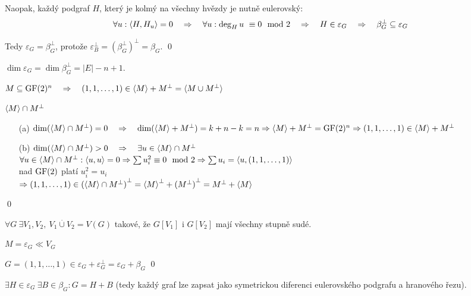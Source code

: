 Naopak, každý podgraf $H$, který je kolmý na všechny hvězdy je nutně eulerovský:
\begin{align*}
\forall u: {\langle H,H_u\rangle} = 0 \quad\Rightarrow\quad \forall u: \deg_H u~\equiv 0 \mod 2 \quad\Rightarrow\quad H \in \varepsilon_G \quad\Rightarrow\quad \beta_G^\bot \subseteq \varepsilon_G
\end{align*}

Tedy $\varepsilon_G = \beta_G^\bot$, protože $\varepsilon_B^\bot = {\left(\beta_G^\bot\right)}^\bot = \beta_G$.
\qed

\dsl $\dim \varepsilon_G = \dim \beta_G^\bot = |E| - n + 1$.


\vt $M \subseteq \mathrm{GF}(2)^n \quad\Rightarrow\quad (1,1,\dots,1) \in {\langle M\rangle} + M^\bot = {\langle M\cup M^\bot\rangle}$

\dk ${\langle M\rangle} \cap M^\bot$
\begin{enumerate}
\item[(a)] $\dim({\langle M\rangle} \cap M^\bot) = 0 \quad\Rightarrow\quad \dim({\langle M\rangle} + M^\bot) = k+n-k = n \Rightarrow {\langle M\rangle} + M^\bot = \mathrm{GF}(2)^n \Rightarrow (1,1,\dots,1)\in {\langle M\rangle} + M^\bot$
\item[(b)] $\dim({\langle M\rangle} \cap M^\bot) > 0 \quad\Rightarrow\quad \exists u\in {\langle M\rangle} \cap M^\bot$ \\ 
$\forall u\in {\langle M\rangle} \cap M^\bot: {\langle u,u\rangle} = 0 \Rightarrow \sum u_i^2 \equiv 0 \mod 2 \Rightarrow \sum u_i = {\langle u, (1,1,\dots,1)\rangle}$ \\
nad $\mathrm{GF}(2)$ platí $u_i^2 = u_i$ \\
$\Rightarrow (1,1,\dots,1) \in {({\langle M\rangle} \cap M^\bot)}^\bot = {{\langle M\rangle}}^\bot + {(M^\bot)}^\bot = M^\bot + {\langle M\rangle}$
\end{enumerate}
\qed


\vt $\forall G \ \exists V_1,V_2,\ V_1\overset{.}{\cup} V_2 = V(G)$ takové, že
$G[V_1]$ i $G[V_2]$ mají všechny stupně sudé.

\dk $M = \varepsilon_G \ll V_G$

$G = (1,1,\dots,1) \in \varepsilon_G + \varepsilon_G^\bot = \varepsilon_G + \beta_G$
\qed

\dsl $\exists H \in \varepsilon_G\ \exists B\in \beta_G: G = H + B$ (tedy každý graf lze zapsat jako symetrickou diferenci eulerovského podgrafu a hranového řezu).


